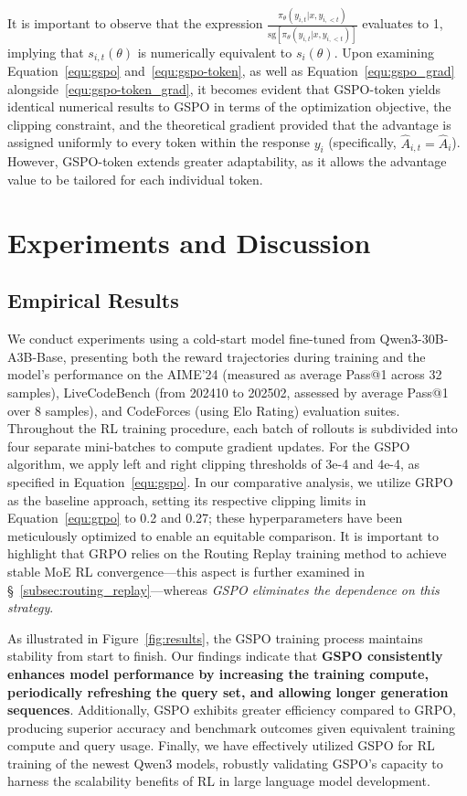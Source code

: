 It is important to observe that the expression $\frac{ \pi_{\theta} (y_{i,t} | x, y_{i,<t}) }{ \mathrm{sg} \left[ \pi_{\theta} (y_{i,t} | x, y_{i,<t}) \right] }$ evaluates to 1, implying that $s_{i,t}(\theta)$ is numerically equivalent to $s_{i}(\theta)$.
Upon examining Equation~\eqref{equ:gspo} and~\eqref{equ:gspo-token}, as well as Equation~\eqref{equ:gspo_grad} alongside~\eqref{equ:gspo-token_grad}, it becomes evident that GSPO-token yields identical numerical results to GSPO in terms of the optimization objective, the clipping constraint, and the theoretical gradient provided that the advantage is assigned uniformly to every token within the response $y_i$ (specifically, $\widehat{A}_{i,t} = \widehat{A}_{i}$). However, GSPO-token extends greater adaptability, as it allows the advantage value to be tailored for each individual token.

\section{Experiments and Discussion}

\subsection{Empirical Results}

We conduct experiments using a cold-start model fine-tuned from Qwen3-30B-A3B-Base, presenting both the reward trajectories during training and the model’s performance on the AIME’24 (measured as average Pass@1 across 32 samples), LiveCodeBench (from 202410 to 202502, assessed by average Pass@1 over 8 samples), and CodeForces (using Elo Rating) evaluation suites. Throughout the RL training procedure, each batch of rollouts is subdivided into four separate mini-batches to compute gradient updates. For the GSPO algorithm, we apply left and right clipping thresholds of 3e-4 and 4e-4, as specified in Equation~\eqref{equ:gspo}. In our comparative analysis, we utilize GRPO as the baseline approach, setting its respective clipping limits in Equation~\eqref{equ:grpo} to 0.2 and 0.27; these hyperparameters have been meticulously optimized to enable an equitable comparison. It is important to highlight that GRPO relies on the Routing Replay training method to achieve stable MoE RL convergence—this aspect is further examined in \S~\ref{subsec:routing_replay}—whereas \textit{GSPO eliminates the dependence on this strategy}.

As illustrated in Figure~\ref{fig:results}, the GSPO training process maintains stability from start to finish. Our findings indicate that \textbf{GSPO consistently enhances model performance by increasing the training compute, periodically refreshing the query set, and allowing longer generation sequences}. Additionally, GSPO exhibits greater efficiency compared to GRPO, producing superior accuracy and benchmark outcomes given equivalent training compute and query usage. Finally, we have effectively utilized GSPO for RL training of the newest Qwen3 models, robustly validating GSPO’s capacity to harness the scalability benefits of RL in large language model development.

